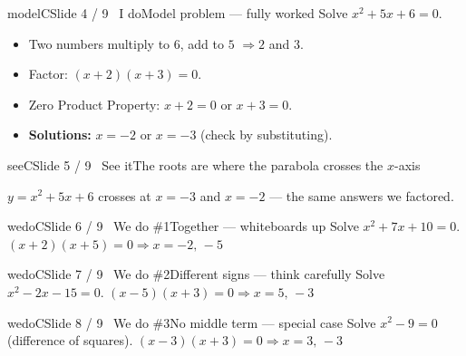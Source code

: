 \documentclass[11pt]{article}
\begin{document}
\begin{slide}{modelC}{Slide 4 / 9 \textbullet\ I do}{Model problem --- fully worked}
Solve $x^{2}+5x+6=0$.
\begin{itemize}[leftmargin=1.3em,itemsep=1pt]
\item Two numbers multiply to $6$, add to $5$ $\Rightarrow 2$ and $3$.
\item Factor: $(x+2)(x+3)=0$.
\item Zero Product Property: $x+2=0$ or $x+3=0$.
\item \textbf{Solutions:} $x=-2$ or $x=-3$ (check by substituting).
\end{itemize}
\end{slide}

\begin{slide}{seeC}{Slide 5 / 9 \textbullet\ See it}{The roots are where the parabola crosses the $x$-axis}
\begin{center}
\end{center}
$y=x^{2}+5x+6$ crosses at $x=-3$ and $x=-2$ --- the same answers we factored.
\end{slide}

\begin{slide}{wedoC}{Slide 6 / 9 \textbullet\ We do \#1}{Together --- whiteboards up}
Solve $x^{2}+7x+10=0$. \hfill \textcolor{modelC}{$(x+2)(x+5)=0\Rightarrow x=-2,\,-5$}
\end{slide}

\begin{slide}{wedoC}{Slide 7 / 9 \textbullet\ We do \#2}{Different signs --- think carefully}
Solve $x^{2}-2x-15=0$. \hfill \textcolor{modelC}{$(x-5)(x+3)=0\Rightarrow x=5,\,-3$}
\end{slide}

\begin{slide}{wedoC}{Slide 8 / 9 \textbullet\ We do \#3}{No middle term --- special case}
Solve $x^{2}-9=0$ (difference of squares). \hfill \textcolor{modelC}{$(x-3)(x+3)=0\Rightarrow x=3,\,-3$}
\end{slide}
\end{document}
